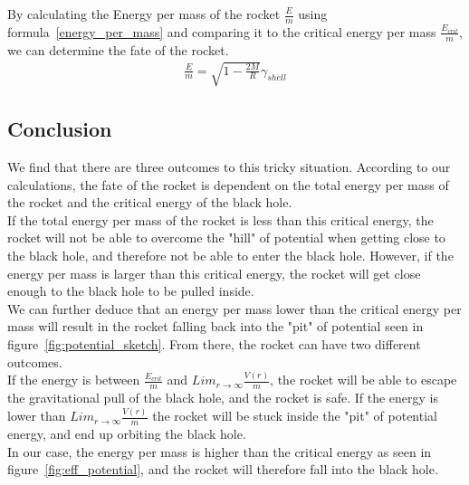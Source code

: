 \documentclass[reprint,english,notitlepage]{revtex4-2}
\begin{document}
        By calculating the Energy per mass of the rocket $\frac{E}{m}$ using formula~\eqref{energy_per_mass} and comparing it to the critical energy per mass $\frac{E_{crit}}{m}$, we can determine the fate of the rocket.
        \begin{align}
            \frac{E}{m} = \sqrt{1-\frac{2M}{R}}\gamma_{shell} \label{energy_per_mass}
        \end{align}





    \subsection{Conclusion}\label{subsec:conclusion6}
        We find that there are three outcomes to this tricky situation.
        According to our calculations, the fate of the rocket is dependent on the total energy per mass of the rocket and the critical energy of the black hole.\\

        If the total energy per mass of the rocket is less than this critical energy, the rocket will not be able to overcome the "hill" of potential when getting close to the black hole, and therefore not be able to enter the black hole.
        However, if the energy per mass is larger than this critical energy, the rocket will get close enough to the black hole to be pulled inside.\\
        We can further deduce that an energy per mass lower than the critical energy per mass will result in the rocket falling back into the "pit" of potential seen in figure~\ref{fig:potential_sketch}.
        From there, the rocket can have two different outcomes.\\
        If the energy is between $\frac{E_{crit}}{m}$ and $Lim_{r \rightarrow \infty} \frac{V(r)}{m}$, the rocket will be able to escape the gravitational pull of the black hole, and the rocket is safe.
        If the energy is lower than $Lim_{r \rightarrow \infty} \frac{V(r)}{m}$ the rocket will be stuck inside the "pit" of potential energy, and end up orbiting the black hole.\\

        In our case, the energy per mass is higher than the critical energy as seen in figure~\ref{fig:eff_potential}, and the rocket will therefore fall into the black hole.\\
\end{document}
